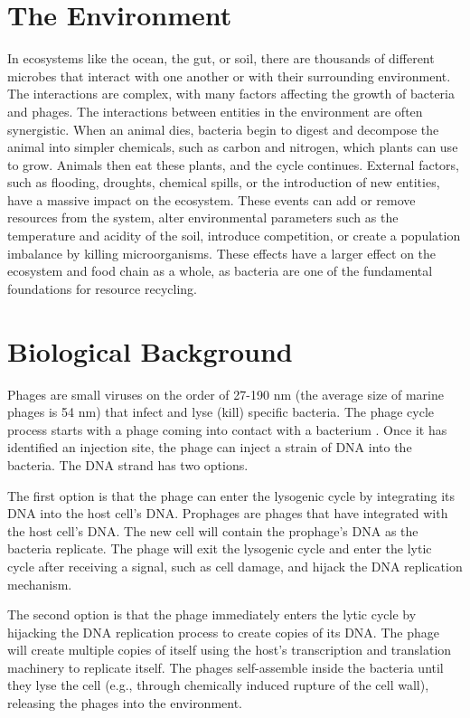 \section{The Environment}
In ecosystems like the ocean, the gut, or soil, there are thousands of different microbes that interact with one another or with their surrounding environment.
The interactions are complex, with many factors affecting the growth of bacteria and phages. 
The interactions between entities in the environment are often synergistic. 
When an animal dies, bacteria begin to digest and decompose the animal into simpler chemicals, such as carbon and nitrogen, which plants can use to grow. 
Animals then eat these plants, and the cycle continues. 
External factors, such as flooding, droughts, chemical spills, or the introduction of new entities, have a massive impact on the ecosystem. 
These events can add or remove resources from the system, alter environmental parameters such as the temperature and acidity of the soil, introduce competition, or create a population imbalance by killing microorganisms. 
These effects have a larger effect on the ecosystem and food chain as a whole, as bacteria are one of the fundamental foundations for resource recycling. 

\section{Biological Background}
Phages are small viruses on the order of 27-190 nm (the average size of marine phages is 54 nm) that infect and lyse (kill) specific bacteria.
The phage cycle process starts with a phage coming into contact with a bacterium .
Once it has identified an injection site, the phage can inject a strain of DNA into the bacteria.
The DNA strand has two options. 

The first option is that the phage can enter the lysogenic cycle by integrating its DNA into the host cell's DNA. 
Prophages are phages that have integrated with the host cell's DNA. 
The new cell will contain the prophage's DNA as the bacteria replicate. 
The phage will exit the lysogenic cycle and enter the lytic cycle after receiving a signal, such as cell damage, and hijack the DNA replication mechanism. 

The second option is that the phage immediately enters the lytic cycle by hijacking the DNA replication process to create copies of its DNA. 
The phage will create multiple copies of itself using the host's transcription and translation machinery to replicate itself.
The phages self-assemble inside the bacteria until they lyse the cell (e.g., through chemically induced rupture of the cell wall), releasing the phages into the environment. 

